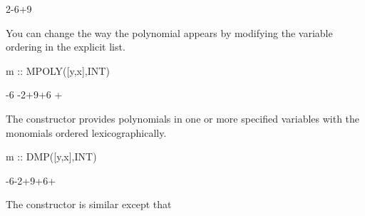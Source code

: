 {{{{{{{{\begin{xtc}
\begin{TeXOutput}
\begin{fricasmath}{3}
{{}}{2}-{6\TIMES {}\TIMES {}}+9\TIMES {}%
\end{fricasmath}
\end{TeXOutput}
\end{xtc}
\begin{xtc}
\begin{xtccomment}
You can change the way the polynomial appears by modifying the variable
ordering in the explicit list.
\end{xtccomment}
\begin{spadsrc}
m :: MPOLY([y,x],INT) 
\end{spadsrc}
\begin{TeXOutput}
\begin{fricasmath}{4}
\TIMES {}-{6\TIMES {}\TIMES %
}-{2\TIMES {}\TIMES {}}+9\TIMES {}+6\TIMES {}\TIMES %
+%
\end{fricasmath}
\end{TeXOutput}
\end{xtc}
\begin{xtc}
\begin{xtccomment}
The constructor
 provides
polynomials in one or more specified variables with the monomials
ordered lexicographically.
\end{xtccomment}
\begin{spadsrc}
m :: DMP([y,x],INT) 
\end{spadsrc}
\begin{TeXOutput}
\begin{fricasmath}{5}
\TIMES {}-{6\TIMES {}\TIMES {}}-{2\TIMES {}\TIMES {}}+9\TIMES {}+6\TIMES {}\TIMES {}+%
\end{fricasmath}
\end{TeXOutput}
\end{xtc}
\begin{xtc}
\begin{xtccomment}
The constructor
 is similar except that

\end{xtccomment}
\end{xtc}}}}}}}}}
